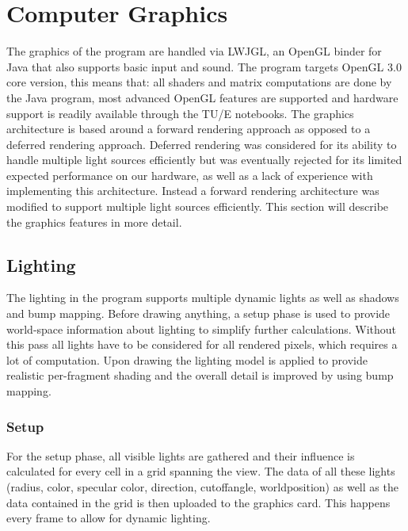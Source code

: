 \chapter{Computer Graphics}
The graphics of the program are handled via LWJGL, an OpenGL binder for Java that also supports basic input and sound. The program targets OpenGL 3.0 core version, this means that: all shaders and matrix computations are done by the Java program, most advanced OpenGL features are supported and hardware support is readily available through the TU/E notebooks. 
The graphics architecture is based around a forward rendering approach as opposed to a deferred rendering approach. Deferred rendering was considered for its ability to handle multiple light sources efficiently but was eventually rejected for its limited expected performance on our hardware, as well as a lack of experience with implementing this architecture. Instead a forward rendering architecture was modified to support multiple light sources efficiently. This section will describe the graphics features in more detail.

\section{Lighting}
The lighting in the program supports multiple dynamic lights as well as shadows and bump mapping.  Before drawing anything, a setup phase is used to provide world-space information about lighting to simplify further calculations. Without this pass all lights have to be considered for all rendered pixels, which requires a lot of computation. Upon drawing the lighting model is applied to provide realistic per-fragment shading and the overall detail is improved by using bump mapping.

\subsection{Setup}
For the setup phase, all visible lights are gathered and their influence is calculated for every cell in a grid spanning the view. The data of all these lights (radius, color, specular color, direction, cutoffangle, worldposition) as well as the data contained in the grid is then uploaded to the graphics card. This happens every frame to allow for dynamic lighting.  


